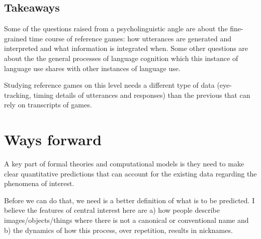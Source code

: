 \documentclass[]{article}
\begin{document}
\subsection{Takeaways}


Some of the questions raised from a psycholinguistic angle are about the fine-grained time course of reference games: how utterances are generated and interpreted and what information is integrated when. Some other questions are about the the general processes of language cognition which this instance of language use shares with other instances of language use.

Studying reference games on this level needs a different type of data (eye-tracking, timing details of utterances and responses) than the previous that can rely on transcripts of games. 


\section{Ways forward}



	
	A key part of formal theories and computational models is they need to make clear quantitative predictions that can account for the existing data regarding the phenomena of interest. 
	
	
	Before we can do that, we need is a better definition of what is to be predicted. I believe the features of central interest here are a) how people describe images/objects/things where there is not a canonical or conventional name and b) the dynamics of how this process, over repetition, results in nicknames. %
	
\end{document}
